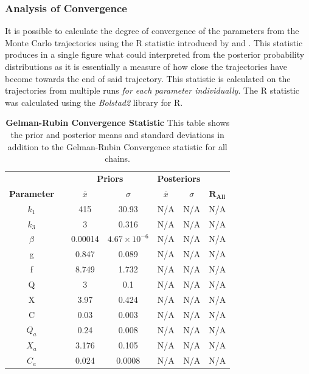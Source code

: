 \subsubsection{Analysis of Convergence}
It is possible to calculate the degree of convergence of the parameters from the Monte Carlo trajectories using the R statistic introduced by \citet{Gelman1992} and \citet{Brooks1998}. This statistic produces in a single figure what could interpreted from the posterior probability distributions as it is essentially a measure of how close the trajectories have become towards the end of said trajectory. This statistic is calculated on the trajectories from multiple runs \textit{for each parameter individually}. The R statistic was calculated using the \textit{Bolstad2}\cite{Curran2011} library for R\cite{RDevelopmentCoreTeam2010}.
\begin{table}[h]%
\renewcommand{\arraystretch}{1.5}
\begin{center}
\begin{tabular}{ccccccc}
\toprule
& & \multicolumn{2}{c}{\textbf{Priors}} & \multicolumn{2}{c}{\textbf{Posteriors}} & \\
\textbf{Parameter} && ${\bar{x}}$ & $\sigma$ & ${\bar{x}}$ & $\sigma$ & $\mathbf{R_{All}}$\\
\midrule
$k_1$ && 415 & 30.93 & N/A & N/A & N/A\\
$k_3$ && 3 & 0.316 & N/A & N/A & N/A\\
$\beta$ && 0.00014 & $4.67\times 10^{-6}$ & N/A & N/A & N/A\\
g && 0.847 & 0.089 & N/A & N/A & N/A\\
f && 8.749 & 1.732 & N/A & N/A & N/A\\
Q && 3 & 0.1 & N/A & N/A & N/A\\
X && 3.97 & 0.424 & N/A & N/A & N/A\\
C && 0.03 & 0.003 & N/A & N/A & N/A\\
$Q_a$ && 0.24 & 0.008 & N/A & N/A & N/A\\
$X_a$ && 3.176 & 0.105 & N/A & N/A & N/A\\
$C_a$ && 0.024 & 0.0008 & N/A & N/A & N/A\\
\bottomrule
\end{tabular}
\end{center}
\caption[Gelman-Rubin Convergence Statistic]{{\bf Gelman-Rubin Convergence Statistic} This table shows the prior and posterior means and standard deviations in addition to the Gelman-Rubin Convergence statistic for all chains.
\label{tab:oxyRstat}}
\end{table}
